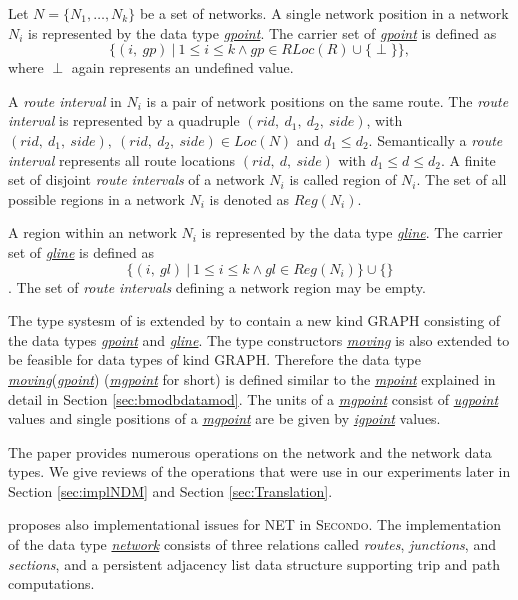 \documentclass[a4paper]{article}
\newcommand{\secondo}{\textsc{Secondo}}
\newcommand{\dt}[1]{\textsl{\underline{#1}}}
\begin{document}
Let $N=\{N_1,\ldots,N_k\}$ be a set of networks. A single network position in a
network $N_i$ is represented by the data type \dt{gpoint}. The carrier set of
\dt{gpoint} is defined as
\[\{(i,\ gp)\ |\ 1 \leq i \leq k \wedge gp \in RLoc(R) \cup \{ \perp \}\},\]
where $\perp$ again represents an undefined value.

A \textit{route interval} in $N_i$ is a pair of network positions on the same
route.
The \textit{route interval} is represented by a quadruple $(rid,\ d_1,\ d_2,\
side)$, with
$(rid,\ d_1,\ side),\ (rid,\ d_2,\ side) \in Loc(N)$
and $d_1 \leq d_2$. Semantically
a \textit{route interval} represents all route locations $(rid,\ d,\ side)$ with
$d_1 \leq d \leq d_2$. A finite set of disjoint \textit{route intervals} of a
network
$N_i$ is called region of $N_i$. The set of all possible regions in a network
$N_i$ is
denoted as $Reg(N_i)$.

A region within an network $N_i$ is represented by the data type \dt{gline}.
The carrier set of \dt{gline} is defined as
\[\{(i,\ gl)\ |\ 1 \leq i \leq k \wedge gl \in Reg(N_i) \} \cup \{\}\].
The set of \textit{route intervals} defining a network region may be empty.

The type systesm of \cite{RepresentingMovingObjectsGueting} is extended by
\cite{NetworkGueting} to contain a new kind GRAPH consisting of the data types
\dt{gpoint} and \dt{gline}. The type constructors \dt{moving} is also extended
to be feasible for data types of kind GRAPH. Therefore the data type
\dt{moving}(\dt{gpoint}) (\dt{mgpoint} for short) is defined similar to the
\dt{mpoint} explained in detail in Section \ref{sec:bmodbdatamod}. The units of
a \dt{mgpoint} consist of \dt{ugpoint} values and single positions of a
\dt{mgpoint} are be given by \dt{igpoint} values.

The paper provides numerous operations on the network and the network data
types.
We give reviews of the operations that were use in our experiments later in
Section \ref{sec:implNDM} and Section \ref{sec:Translation}.

\cite{NetworkGueting} proposes also implementational issues for NET in
\secondo{}. The implementation of the data type \dt{network} consists of three
relations called \textit{routes}, \textit{junctions}, and \textit{sections}, and a persistent
adjacency
list data structure supporting trip and path computations.
\end{document}
